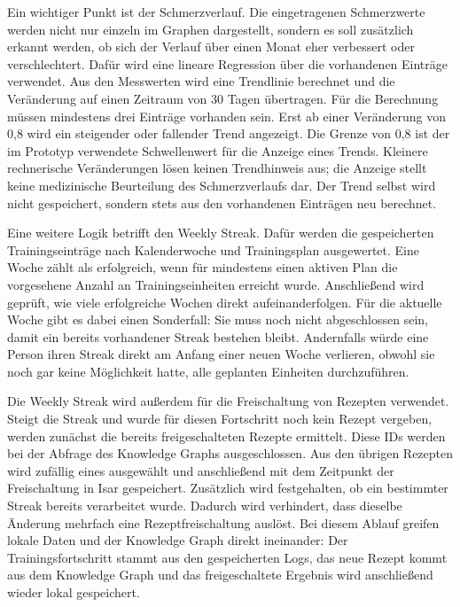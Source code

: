 Ein wichtiger Punkt ist der Schmerzverlauf. Die eingetragenen Schmerzwerte werden nicht nur einzeln im Graphen dargestellt, sondern es soll zusätzlich erkannt werden, ob sich der Verlauf über einen Monat eher verbessert oder verschlechtert. Dafür wird eine lineare Regression über die vorhandenen Einträge verwendet. Aus den Messwerten wird eine Trendlinie berechnet und die Veränderung auf einen Zeitraum von 30 Tagen übertragen. Für die Berechnung müssen mindestens drei Einträge vorhanden sein. Erst ab einer Veränderung von 0,8 wird ein steigender oder fallender Trend angezeigt. Die Grenze von 0,8 ist der im Prototyp verwendete Schwellenwert für die Anzeige eines Trends. Kleinere rechnerische Veränderungen lösen keinen Trendhinweis aus; die Anzeige stellt keine medizinische Beurteilung des Schmerzverlaufs dar. Der Trend selbst wird nicht gespeichert, sondern stets aus den vorhandenen Einträgen neu berechnet.

Eine weitere Logik betrifft den Weekly Streak. Dafür werden die gespeicherten Trainingseinträge nach Kalenderwoche und Trainingsplan ausgewertet. Eine Woche zählt als erfolgreich, wenn für mindestens einen aktiven Plan die vorgesehene Anzahl an Trainingseinheiten erreicht wurde. Anschließend wird geprüft, wie viele erfolgreiche Wochen direkt aufeinanderfolgen. Für die aktuelle Woche gibt es dabei einen Sonderfall: Sie muss noch nicht abgeschlossen sein, damit ein bereits vorhandener Streak bestehen bleibt. Andernfalls würde eine Person ihren Streak direkt am Anfang einer neuen Woche verlieren, obwohl sie noch gar keine Möglichkeit hatte, alle geplanten Einheiten durchzuführen.

Die Weekly Streak wird außerdem für die Freischaltung von Rezepten verwendet. Steigt die Streak und wurde für diesen Fortschritt noch kein Rezept vergeben, werden zunächst die bereits freigeschalteten Rezepte ermittelt. Diese IDs werden bei der Abfrage des Knowledge Graphs ausgeschlossen. Aus den übrigen Rezepten wird zufällig eines ausgewählt und anschließend mit dem Zeitpunkt der Freischaltung in Isar gespeichert. Zusätzlich wird festgehalten, ob ein bestimmter Streak bereits verarbeitet wurde. Dadurch wird verhindert, dass dieselbe Änderung mehrfach eine Rezeptfreischaltung auslöst. Bei diesem Ablauf greifen lokale Daten und der Knowledge Graph direkt ineinander: Der Trainingsfortschritt stammt aus den gespeicherten Logs, das neue Rezept kommt aus dem Knowledge Graph und das freigeschaltete Ergebnis wird anschließend wieder lokal gespeichert.

